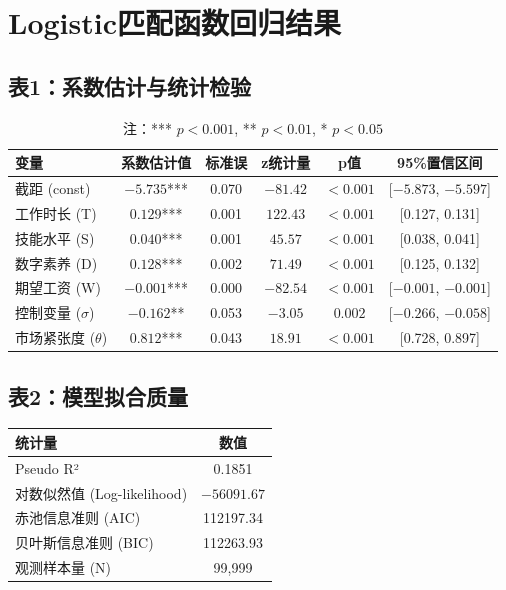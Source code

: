 \documentclass[12pt, a4paper]{article}
\begin{document}
\section*{Logistic匹配函数回归结果}

\subsection*{表1：系数估计与统计检验}

\begin{table}[htbp]
\centering
\begin{tabular}{lccccc}
\toprule
\textbf{变量} & \textbf{系数估计值} & \textbf{标准误} & \textbf{z统计量} & \textbf{p值} & \textbf{95\%置信区间} \\
\midrule
截距 (const)        & $-5.735$*** & 0.070 & $-81.42$ & $<0.001$ & [$-5.873$, $-5.597$] \\
工作时长 (T)        & $0.129$***  & 0.001 & $122.43$ & $<0.001$ & [0.127, 0.131] \\
技能水平 (S)        & $0.040$***  & 0.001 & $45.57$  & $<0.001$ & [0.038, 0.041] \\
数字素养 (D)        & $0.128$***  & 0.002 & $71.49$  & $<0.001$ & [0.125, 0.132] \\
期望工资 (W)        & $-0.001$*** & 0.000 & $-82.54$ & $<0.001$ & [$-0.001$, $-0.001$] \\
控制变量 ($\sigma$) & $-0.162$**  & 0.053 & $-3.05$  & $0.002$  & [$-0.266$, $-0.058$] \\
市场紧张度 ($\theta$) & $0.812$*** & 0.043 & $18.91$  & $<0.001$ & [0.728, 0.897] \\
\bottomrule
\end{tabular}
\caption*{注：*** $p<0.001$, ** $p<0.01$, * $p<0.05$}
\end{table}

\vspace{1cm}

\subsection*{表2：模型拟合质量}

\begin{table}[htbp]
\centering
\begin{tabular}{lc}
\toprule
\textbf{统计量} & \textbf{数值} \\
\midrule
Pseudo R²         & 0.1851 \\
对数似然值 (Log-likelihood) & $-56091.67$ \\
赤池信息准则 (AIC) & 112197.34 \\
贝叶斯信息准则 (BIC) & 112263.93 \\
观测样本量 (N)    & 99,999 \\
\bottomrule
\end{tabular}
\end{table}
\end{document}

